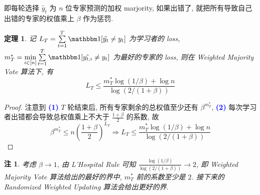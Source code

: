 \documentclass[8pt]{article}
\theoremstyle{compact}
\newtheorem{theorem}{定理}[section]
\newtheorem{remark}{注}[section]
\def\num#1{\textnormal{\textbf{\mbox{\textcolor{blue}{(#1)}}}}}
\def\le{\leqslant}
\begin{document}
即每轮选择 $\tilde{y_t}$ 为 $n$ 位专家预测的加权  marjority, 如果出错了, 就把所有导致自己出错的专家的权值乘上 $\beta$ 作为惩罚.

\begin{theorem}
	记 $L_T = \sum\limits_{t=1}^{T}\mathbbm 1[\tilde{y_t} \neq y_t]$ 为学习者的 loss, $m_T^* = \min\limits_{i \in [n]}\sum\limits_{t=1}^{T}\mathbbm 1[\tilde{y_{t, i}} \neq y_t]$ 为最好的专家的 loss, 则在 Weighted Majority Vote 算法下, 有 $$L _T \le \frac{m_T^*\log(1 / \beta) + \log n}{\log(2/(1 + \beta))}$$
\end{theorem}
\begin{proof}
	注意到 \num{1} $T$ 轮结束后, 所有专家剩余的总权值至少还有 $\beta^{m_T^*}$, \num{2} 每次学习者出错都会导致总权值乘上不大于 $\frac{1 + \beta}{2}$ 的系数, 故
	$$\beta^{m_T^*} \le n\left(\frac{1 + \beta}{2}\right)^{L_T} \Rightarrow L_T \le \frac{m_T^*\log(1 / \beta) + \log n}{\log(2/(1 + \beta))}$$
\end{proof}
\begin{remark}
	考虑 $\beta \to 1$, 由 L'Hospital Rule 可知 $\frac{\log(1 / \beta)}{\log(2 / (1 + \beta))} \to 2$, 即 Weighted Majority Vote 算法给出的最好的界中, $m_T^*$ 前的系数至少是 $2$. 接下来的 Randomized Weighted Updating 算法会给出更好的界.
\end{remark}
\end{document}
